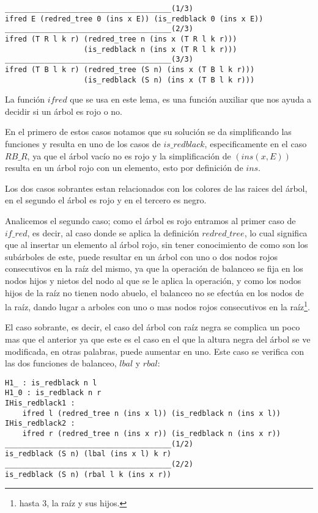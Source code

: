  \begin{verbatim}
______________________________________(1/3)
ifred E (redred_tree 0 (ins x E)) (is_redblack 0 (ins x E))
______________________________________(2/3)
ifred (T R l k r) (redred_tree n (ins x (T R l k r)))
                  (is_redblack n (ins x (T R l k r)))
______________________________________(3/3)
ifred (T B l k r) (redred_tree (S n) (ins x (T B l k r)))
                  (is_redblack (S n) (ins x (T B l k r)))
 \end{verbatim}

La funci\'on $ifred$ que se usa en este lema, es una funci\'on auxiliar que nos ayuda a decidir si
un \'arbol es rojo o no.

En el primero de estos casos notamos que su soluci\'on se da simplificando las funciones y resulta
en uno de los casos de $is\_redblack$, especificamente en el caso $RB\_R$, ya que el \'arbol vacío
no es rojo y la simplificaci\'on de $(ins(x,E))$ resulta en un \'arbol rojo con un elemento, esto
por definici\'on de $ins$.

Los dos casos sobrantes estan relacionados con los colores de las raices del \'arbol, en el
segundo el \'arbol es rojo y en el tercero es negro.

Analicemos el segundo caso; como el \'arbol es rojo entramos al primer caso de $if\_red$, es decir,
al caso donde se aplica la definici\'on $redred\_tree$, lo cual significa que al insertar un elemento al
\'arbol rojo, sin tener conocimiento de como son los subárboles de este, puede resultar en un
\'arbol con uno o dos nodos rojos consecutivos en la ra\'iz del mismo, ya que la operaci\'on de
balanceo se fija en los nodos hijos y nietos del nodo al que se le aplica la operaci\'on, y como
los nodos hijos de la raíz no tienen nodo abuelo, el balanceo no se efectúa en los nodos de la raíz, 
dando lugar a arboles con uno o mas nodos rojos consecutivos en la raíz\footnote{hasta 3, la raíz y
sus hijos.}.

El caso sobrante, es decir, el caso del \'arbol con raíz negra se complica un poco mas que el 
anterior ya que este es el caso en el que la altura negra del \'arbol se ve modificada, en otras 
palabras, puede aumentar en uno. Este caso se verifica con las dos funciones de balanceo, $lbal$ y 
$rbal$:

\begin{verbatim}
H1_ : is_redblack n l
H1_0 : is_redblack n r
IHis_redblack1 :
    ifred l (redred_tree n (ins x l)) (is_redblack n (ins x l))
IHis_redblack2 :
    ifred r (redred_tree n (ins x r)) (is_redblack n (ins x r))
______________________________________(1/2)
is_redblack (S n) (lbal (ins x l) k r)
______________________________________(2/2)
is_redblack (S n) (rbal l k (ins x r))
\end{verbatim}

